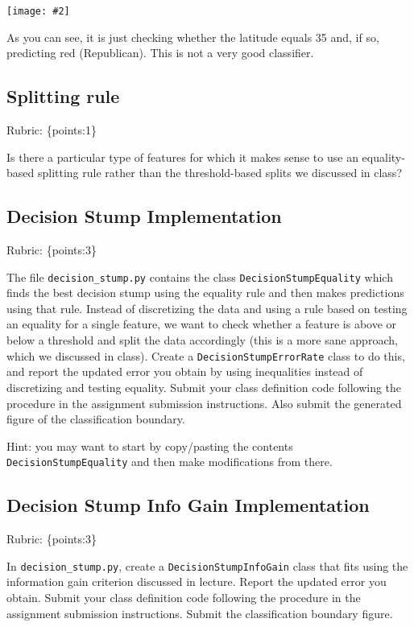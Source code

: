 \documentclass{article}
\def\rubric#1{\gre{Rubric: \{#1\}}}{}
\def\blu#1{{\color{blu}#1}}
\def\gre#1{{\color{gre}#1}}
\newcommand{\centerfig}[2]{\begin{center}\texttt{[image: \#2]}\end{center}}
\begin{document}
	\centerfig{0.7}{./figs/q6_decisionBoundary}

	As you can see, it is just checking whether the latitude equals 35 and, if so, predicting red (Republican).
	This is not a very good classifier.

	\subsection{Splitting rule}
	\rubric{points:1}

	Is there a particular type of features for which it makes sense to use an equality-based splitting rule rather than the threshold-based splits we discussed in class?


	\subsection{Decision Stump Implementation}
	\rubric{points:3}

	The file \texttt{decision\string_stump.py} contains the class \texttt{DecisionStumpEquality} which
	finds the best decision stump using the equality rule and then makes predictions using that
	rule. Instead of discretizing the data and using a rule based on testing an equality for
	a single feature, we want to check whether a feature is above or below a threshold and
	split the data accordingly (this is a more sane approach, which we discussed in class).
	\blu{Create a \texttt{DecisionStumpErrorRate} class to do this, and report the updated error you
		obtain by using inequalities instead of discretizing and testing equality.
		Submit your class definition code following the procedure in the assignment submission instructions.
		Also submit the generated figure of the classification boundary.}

	Hint: you may want to start by copy/pasting the contents \texttt{DecisionStumpEquality} and then make modifications from there.


	\subsection{Decision Stump Info Gain Implementation}
	\rubric{points:3}

	In \texttt{decision\string_stump.py}, \blu{create a \texttt{DecisionStumpInfoGain} class that
		fits using the information gain criterion discussed in lecture.
		Report the updated error you obtain.
		Submit your class definition code following the procedure in the assignment submission instructions.
		Submit the classification boundary figure.}
\end{document}
